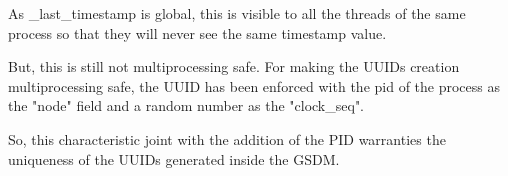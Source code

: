 As \_last\_timestamp is global, this is visible to all the threads of the same process so that they will never see the same timestamp value.

But, this is still not multiprocessing safe. For making the UUIDs creation multiprocessing safe, the UUID has been enforced with the \acrshort{pid} of the process as the "node" field and a random number as the "clock\_seq".

So, this characteristic joint with the addition of the PID warranties the uniqueness of the UUIDs generated inside the GSDM.
